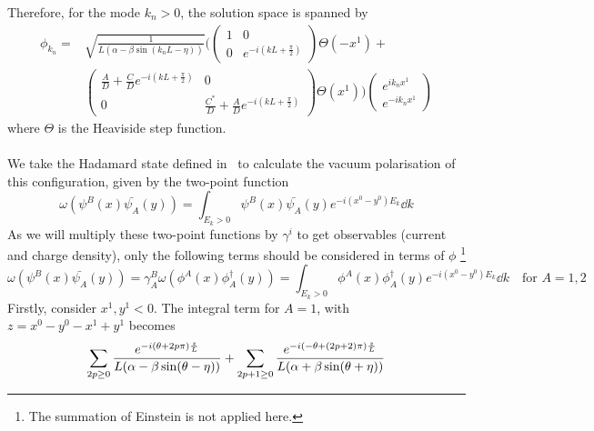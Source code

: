 Therefore, for the mode $k_n > 0$, the solution space is spanned by 
\begin{equation}
\begin{split}
\phi_{k_{n}} = 
& \sqrt{\frac{1}{L(\alpha - \beta \sin (k_{n}L - \eta))}} \Bigg( 
\begin{pmatrix}
1 & 0 \\
0  & e^{-i(kL + \frac{\pi}{2})}
\end{pmatrix}
\Theta(-x^1) + \\
& \begin{pmatrix}
\frac{A}{D}  +  \frac{C}{D} e^{-i(kL + \frac{\pi}{2})} & 0 \\
0  & \frac{C^*}{D}  + \frac{A}{D}e^{-i(kL + \frac{\pi}{2})}
\end{pmatrix}\Theta(x^1)\Bigg)
\begin{pmatrix}
e^{ik_{n} x^1} \\
e^{- ik_{n} x^1}
\end{pmatrix}
\end{split}
\end{equation}
where $\Theta$ is the Heaviside step function.\\\\
We take the Hadamard state defined in~\cite{Zahn2015} to calculate the vacuum polarisation of this configuration, given by the two-point function
\begin{equation}\label{vacuum-nefvacpol}
\omega(\psi^B(x) \bar{\psi_A}(y)) = \int_{E_k > 0} \psi^B(x) \bar{\psi_A}(y) e^{-i(x^0 - y^0) E_k} \dd k
\end{equation}
As we will multiply these two-point functions by $\gamma^i$ to get observables (current and charge density), only the following terms should be considered in terms of $\phi$ \footnote{
The summation of Einstein is not applied here.}
\begin{equation}
\omega(\psi^B(x) \bar{\psi_A}(y)) = 
\gamma^B_A \omega(\phi^A(x) \phi^\dagger_A(y)) = 
\int_{E_k > 0} \phi^A(x) \phi^\dagger_A(y) e^{-i(x^0 - y^0) E_k} \dd k
\quad \textrm{for $A = 1,2$}
\end{equation}
Firstly, consider $x^1, y^1 < 0$. The integral term for $A =1$, with $z =x^0 - y^0 - x^1 +y^1$ becomes
\begin{equation}
\sum_{2p \geq 0} \frac{e^{-i(\theta + 2p\pi)\frac{z}{L}}}{L(\alpha - \beta \sin (\theta - \eta))} 
+ \sum_{2p+1 \geq 0} \frac{e^{-i(- \theta + (2p+2)\pi)\frac{z}{L}}}{L(\alpha + \beta \sin (\theta + \eta))}\\
\end{equation}

